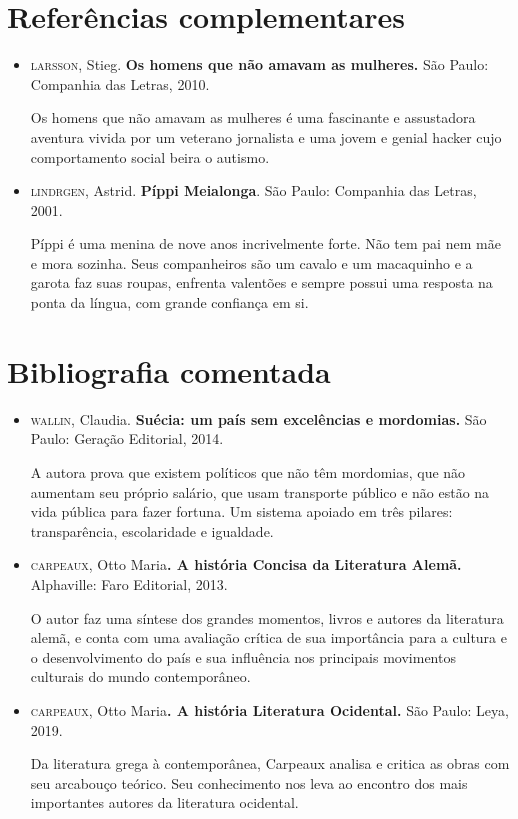 \documentclass[12pt]{extarticle}
\begin{document}
\section{Referências complementares}

\begin{itemize}
\item\textsc{larsson}, Stieg. \textbf{Os homens que não amavam as mulheres.} São
Paulo: Companhia das Letras, 2010.

Os homens que não amavam as mulheres é uma fascinante e assustadora
aventura vivida por um veterano jornalista e uma jovem e genial hacker
cujo comportamento social beira o autismo.

\item\textsc{lindrgen}, Astrid. \textbf{Píppi Meialonga}. São Paulo: Companhia das
Letras, 2001.

Píppi é uma menina de nove anos incrivelmente forte. Não tem pai nem mãe
e mora sozinha. Seus companheiros são um cavalo e um macaquinho e a
garota faz suas roupas, enfrenta valentões e sempre possui uma resposta
na ponta da língua, com grande confiança em si.
\end{itemize}

\section{Bibliografia comentada}

\begin{itemize}
\item\textsc{wallin}, Claudia. \textbf{Suécia: um país sem excelências e mordomias.}
São Paulo: Geração Editorial, 2014.

A autora prova que existem políticos que não têm mordomias, que não
aumentam seu próprio salário, que usam transporte público e não estão na
vida pública para fazer fortuna. Um sistema apoiado em três pilares:
transparência, escolaridade e igualdade.

\item\textsc{carpeaux}, Otto Maria\textbf{. A história Concisa da Literatura Alemã.}
Alphaville: Faro Editorial, 2013.

O autor faz uma síntese dos grandes momentos, livros e autores da
literatura alemã, e conta com uma avaliação crítica de sua importância
para a cultura e o desenvolvimento do país e sua influência nos
principais movimentos culturais do mundo contemporâneo.

\item\textsc{carpeaux}, Otto Maria\textbf{. A história Literatura Ocidental.} São
Paulo: Leya, 2019.

Da literatura grega à contemporânea, Carpeaux analisa e critica as obras
com seu arcabouço teórico. Seu conhecimento nos leva ao encontro dos
mais importantes autores da literatura ocidental.
\end{itemize}
\end{document}
